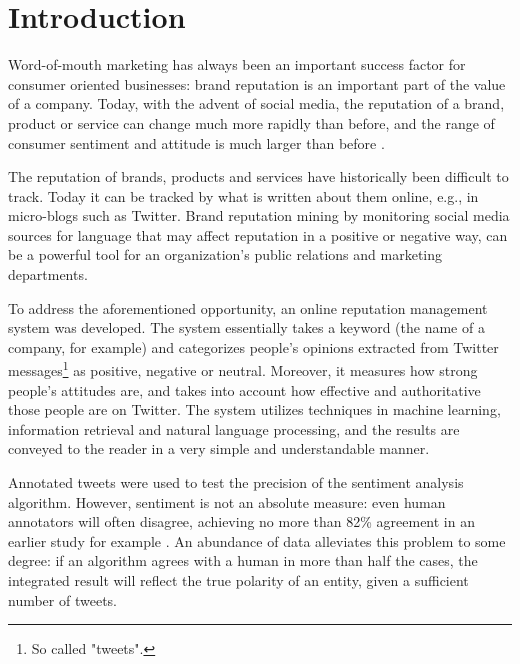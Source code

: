 \section{Introduction}\label{sec:introduction}             %
Word-of-mouth marketing has always been an important success factor for consumer oriented businesses: brand reputation is an important part of the value of a company. Today, with the advent of social media, the reputation of a brand, product or service can change much more rapidly than before, and the range of consumer sentiment and attitude is much larger than before \cite{pang2008opinion}.

The reputation of brands, products and services have historically been difficult to track. Today it can be tracked by what is written about them online, e.g., in micro-blogs such as Twitter. Brand reputation mining by monitoring social media sources for language that may affect reputation in a positive or negative way, can be a powerful tool for an organization's public relations and marketing departments.

To address the aforementioned opportunity, an online reputation management system was developed. The system essentially takes a keyword (the name of a company, for example) and categorizes people's opinions extracted from Twitter messages\footnote{So called "tweets".} as positive, negative or neutral. Moreover, it measures how strong people's attitudes are, and takes into account how effective and authoritative those people are on Twitter. The system utilizes techniques in machine learning, information retrieval and natural language processing, and the results are conveyed to the reader in a very simple and understandable manner.

Annotated tweets were used to test the precision of the sentiment analysis algorithm. However, sentiment is not an absolute measure: even human annotators will often disagree, achieving no more than 82\% agreement in an earlier study for example \cite{wilson2005recognizing}. An abundance of data alleviates this problem to some degree: if an algorithm agrees with a human in more than half the cases, the integrated result will reflect the true polarity of an entity, given a sufficient number of tweets.